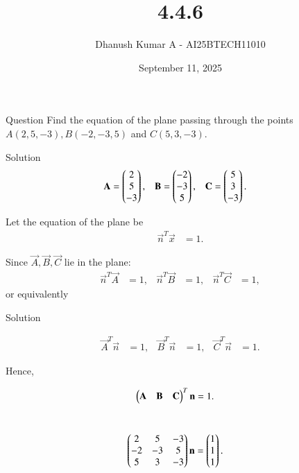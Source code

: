 \documentclass{beamer}
\title 
{4.4.6}
\date{September 11, 2025}
\author 
{Dhanush Kumar A - AI25BTECH11010}
\begin{document}
\frame{\titlepage}
\begin{frame}{Question}
Find the equation of the plane passing through the points 
$A(2, 5, -3), B(-2, -3, 5)$ and $C(5, 3, -3)$.
\end{frame}
\begin{frame}{Solution}
\begin{align}
\mathbf{A} &= \begin{pmatrix}2 \\ 5 \\ -3\end{pmatrix}, & 
\mathbf{B} &= \begin{pmatrix}-2 \\ -3 \\ 5\end{pmatrix}, & 
\mathbf{C} &= \begin{pmatrix}5 \\ 3 \\ -3\end{pmatrix}.
\end{align}

Let the equation of the plane be
\begin{align}
\vec{n}^T \vec{x} &= 1.
\end{align}

Since $\vec{A}, \vec{B}, \vec{C}$ lie in the plane:
\begin{align}
\vec{n}^T \vec{A} &= 1, & 
\vec{n}^T \vec{B} &= 1, & 
\vec{n}^T \vec{C} &= 1,
\end{align}
or equivalently
\end{frame}
\begin{frame}{Solution}

\begin{align}
\vec{A}^T \vec{n} &= 1, & 
\vec{B}^T \vec{n} &= 1, & 
\vec{C}^T \vec{n} &= 1.
\end{align}

Hence,


\begin{align}
\begin{pmatrix}\mathbf{A} & \mathbf{B} & \mathbf{C}\end{pmatrix}^{T} \mathbf{n} 
&= 1.
\end{align}
\

\begin{align}
\begin{pmatrix} 2 & 5 & -3 \\ -2 & -3 & 5 \\ 5 & 3 & -3\end{pmatrix}\mathbf{n}
&= \begin{pmatrix}1 \\ 1 \\ 1\end{pmatrix}.
\end{align}
\end{frame}
\end{document}
